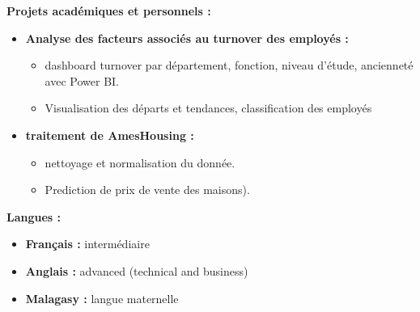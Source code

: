 \documentclass[a4paper,12pt]{article}
\renewcommand\labelitemi{$\bullet$}
\begin{document}
\begin{minipage}{0.45\textwidth}
\raggedright
\vspace{0.5cm}
\textbf{Projets académiques et personnels :}\\
\begin{itemize}
\renewcommand\labelitemi{$\bullet$} %
    \item{ \textbf{Analyse des facteurs associés au turnover des employés : }
        \begin{itemize}
        \renewcommand\labelitemi{$\bullet$} %
            \item{ dashboard turnover par département, fonction, niveau d'étude, ancienneté avec Power BI. 
            }
            \item{ 
            Visualisation des départs et tendances, classification des employés
            }
        \end{itemize}
        }
        
    \item{ \textbf{traitement de AmesHousing : }
        \begin{itemize}
        \renewcommand\labelitemi{$\bullet$} %
            
            \item{ nettoyage et normalisation du donnée.
            }
            \item{ Prediction de prix de vente des maisons). 
            }
        \end{itemize}
    }
    \end{itemize}
    \vspace{0.5cm}
\textbf{Langues :}\\
\begin{itemize}
    \renewcommand\labelitemi{$\bullet$} %
        \item{ \textbf{Français : }}intermédiaire
        \item{  \textbf{Anglais : }}advanced (technical and business)
        \item{  \textbf{Malagasy : }}langue maternelle
\end{itemize}
        
\end{minipage}
\end{document}
